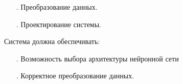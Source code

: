 {	\begin{itemize}[leftmargin=2.15cm, labelwidth=0.65cm, labelsep=0.0cm] 
		
		\item[\theitemcntr. ] Преобразование данных.		
		\addtocounter{itemcntr}{1}
		
		\item[\theitemcntr. ] Проектирование системы.		
		\addtocounter{itemcntr}{1}
		
		\setcounter{itemcntr}{1}
	\end{itemize} 	

	\par \redline Система должна обеспечивать:
	
	\begin{itemize}[leftmargin=2.15cm, labelwidth=0.65cm, labelsep=0.0cm] 
		
		\item[\theitemcntr. ] Возможность выбора архитектуры нейронной сети		
		\addtocounter{itemcntr}{1}
		
		\item[\theitemcntr. ] Корректное преобразование данных.		
		\addtocounter{itemcntr}{1}
		
		\setcounter{itemcntr}{1}
	\end{itemize} 	
	
	\par 
}

%



\setcounter{subchaptercntr}{1}
\setcounter{formulacntr}{1}
\setcounter{imagecntr}{1}
\setcounter{tablecntr}{1}

